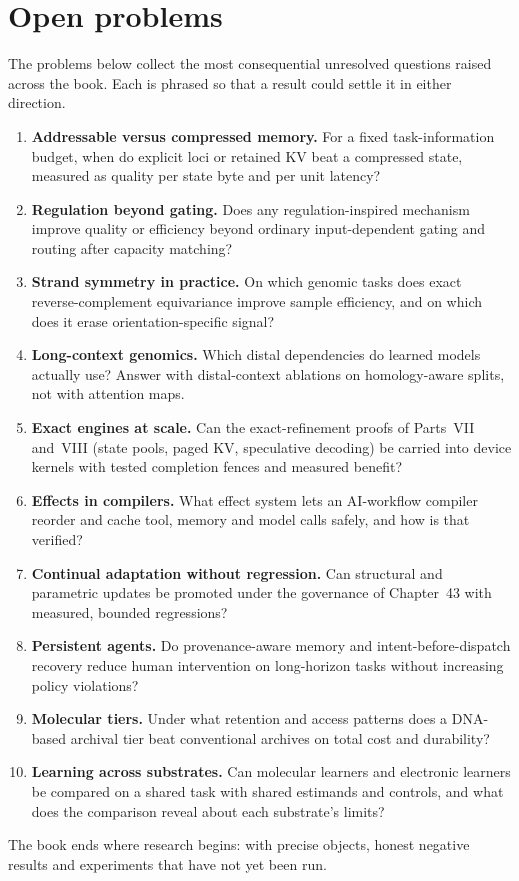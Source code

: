 \section*{Open problems}
The problems below collect the most consequential unresolved questions raised across
the book. Each is phrased so that a result could settle it in either direction.
\begin{enumerate}
\setlength{\itemsep}{1pt}
\item \textbf{Addressable versus compressed memory.} For a fixed task-information
budget, when do explicit loci or retained KV beat a compressed state, measured as
quality per state byte and per unit latency?
\item \textbf{Regulation beyond gating.} Does any regulation-inspired mechanism improve
quality or efficiency beyond ordinary input-dependent gating and routing after capacity
matching?
\item \textbf{Strand symmetry in practice.} On which genomic tasks does exact
reverse-complement equivariance improve sample efficiency, and on which does it erase
orientation-specific signal?
\item \textbf{Long-context genomics.} Which distal dependencies do learned models
actually use? Answer with distal-context ablations on homology-aware splits, not with
attention maps.
\item \textbf{Exact engines at scale.} Can the exact-refinement proofs of Parts~VII
and~VIII (state pools, paged KV, speculative decoding) be carried into device kernels
with tested completion fences and measured benefit?
\item \textbf{Effects in compilers.} What effect system lets an AI-workflow compiler
reorder and cache tool, memory and model calls safely, and how is that verified?
\item \textbf{Continual adaptation without regression.} Can structural and parametric
updates be promoted under the governance of Chapter~43 with measured, bounded
regressions?
\item \textbf{Persistent agents.} Do provenance-aware memory and intent-before-dispatch
recovery reduce human intervention on long-horizon tasks without increasing policy
violations?
\item \textbf{Molecular tiers.} Under what retention and access patterns does a
DNA-based archival tier beat conventional archives on total cost and durability?
\item \textbf{Learning across substrates.} Can molecular learners and electronic learners
be compared on a shared task with shared estimands and controls, and what does the
comparison reveal about each substrate's limits?
\end{enumerate}
The book ends where research begins: with precise objects, honest negative results and
experiments that have not yet been run.
